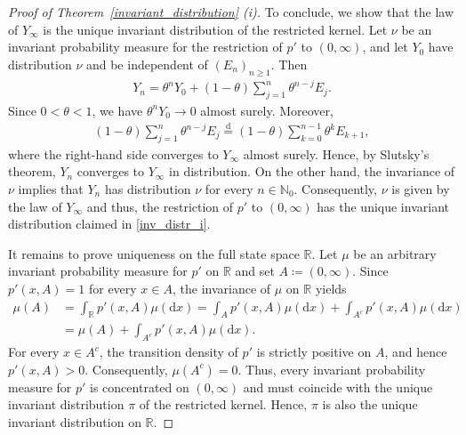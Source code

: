 \documentclass[10pt,a4paper]{amsart}
\newcommand{\N}{\mathbb{N}} %
\newcommand{\R}{\mathbb{R}} %
\newcommand{\1}{\mathds{1}}
\renewcommand{\d}{\mathrm{d}}
\begin{document}
\begin{proof}[Proof of Theorem~\ref{invariant_distribution} (i)]
To conclude, we show that the law of $Y_\infty$ is the unique invariant distribution of the restricted kernel. Let $\nu$ be an invariant probability measure for the restriction of $p'$ to $(0,\infty)$, and let $Y_0$ have distribution $\nu$ and be independent of $(E_n)_{n\geq1}$. Then
\begin{align*}
    Y_n  = \theta^nY_0  +(1-\theta)\sum_{j=1}^n\theta^{n-j}E_j.
\end{align*}
Since $0<\theta<1$, we have $\theta^nY_0\to0$ almost surely. Moreover,
\begin{align*}
    (1-\theta)\sum_{j=1}^n\theta^{n-j}E_j  \overset{\d}{=}(1-\theta)\sum_{k=0}^{n-1}\theta^kE_{k+1},
\end{align*}
where the right-hand side converges to $Y_\infty$ almost surely. Hence, by Slutsky's theorem, $Y_n$ converges to $Y_\infty$ in distribution. On the other hand, the invariance of $\nu$ implies that $Y_n$ has distribution $\nu$ for every $n\in\N_0$. Consequently, $\nu $ is given by the law of $Y_\infty$ and thus, the restriction of $p'$ to $(0,\infty)$ has the unique invariant distribution claimed in \eqref{inv_distr_i}.

It remains to prove uniqueness on the full state space $\R$. Let $\mu$ be an arbitrary invariant probability measure for $p'$ on $\R$ and set $A\coloneqq(0,\infty)$. Since $p'(x,A)=1$ for every $x\in A$, the invariance of $\mu$ on $\R$ yields
\begin{align*}
    \mu(A)
    &= \int_{\R}p'(x,A)\mu(\d x) 
    = \int_Ap'(x,A)\mu(\d x)
       +\int_{A^c}p'(x,A)\mu(\d x) 
    \\&= \mu(A)+\int_{A^c}p'(x,A)\mu(\d x).
\end{align*}
For every $x\in A^c$, the transition density of $p'$ is strictly positive on $A$, and hence $p'(x,A)>0$. Consequently, $\mu(A^c)=0$. Thus, every invariant probability measure for $p'$ is concentrated on $(0,\infty)$ and must coincide with the unique invariant distribution $\pi$ of the restricted kernel. Hence, $\pi$ is also the unique invariant distribution on $\R$.
\end{proof}
\end{document}
